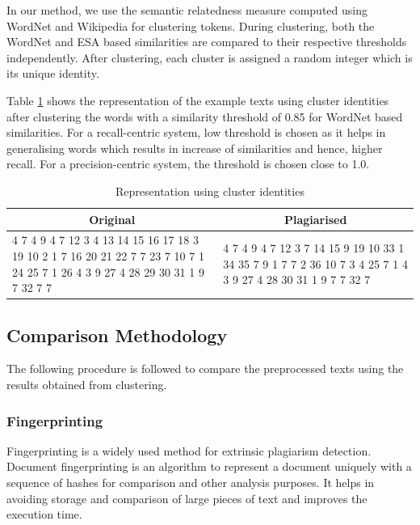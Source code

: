 \documentclass[11pt]{article}
\begin{document}
In our method, we use the semantic relatedness measure computed using WordNet and Wikipedia for clustering tokens. During clustering, both the WordNet and ESA based similarities are compared to their respective thresholds independently. After clustering, each cluster is assigned a random integer which is its unique identity.
 
 Table \ref{fp} shows the representation of the example texts using cluster identities after clustering the words with a similarity threshold of 0.85 for WordNet based similarities. For a recall-centric system, low threshold is chosen as it helps in generalising words which results in increase of similarities and hence, higher recall. For a precision-centric system, the threshold is chosen close to 1.0.
 
\begin{table}[h]
\footnotesize
\begin{tabularx}{\columnwidth}{|X|X|}
\hline \multicolumn{1}{|c|}{ \textbf{Original}} &  \multicolumn{1}{c|}{\textbf{Plagiarised}} \\
\hline
4 7 4 9 4 7 12 3 4 13 14 15 16 17 18 3 19 10 2 1 7 16 20 21 22 7 7 23 7 10 7 1 24 25 7 1 26 4 3 9 27 4 28 29 30 31 1 9 7 32 7 7
&
4 7 4 9 4 7 12 3 7 14 15 9 19 10 33 1 34 35 7 9 1 7 7 2 36 10 7 3 4 25 7 1 4 3 9 27 4 28 30 31 1 9 7 7 32 7\\
\hline
\end{tabularx}
\caption{Representation using cluster identities}
 \label{fp}
\end{table}

\subsection{Comparison Methodology}
The following procedure is followed to compare the preprocessed texts using the results obtained from clustering.

\subsubsection*{Fingerprinting} 
Fingerprinting is a widely used method for extrinsic plagiarism detection. Document fingerprinting is an algorithm to represent a document uniquely with a sequence of hashes for comparison and other analysis purposes. It helps in avoiding storage and comparison of large pieces of text and improves the execution time.
\end{document}

